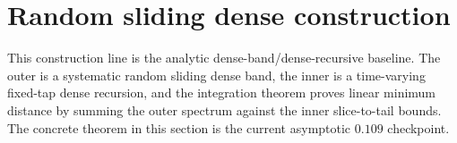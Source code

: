 \section{Random sliding dense construction}
\label{sec:random-sliding-dense-construction}

This construction line is the analytic dense-band/dense-recursive baseline.
The outer is a systematic random sliding dense band, the inner is a
time-varying fixed-tap dense recursion, and the integration theorem proves
linear minimum distance by summing the outer spectrum against the inner
slice-to-tail bounds.  The concrete theorem in this section is the current
asymptotic \(0.109\) checkpoint.




